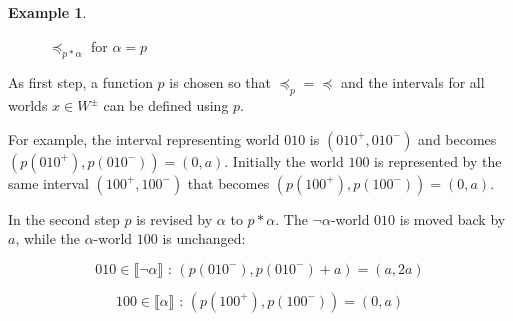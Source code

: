 \documentclass[english, 12pt]{scrartcl}
\theoremstyle{definition}
\newtheorem{example}{Example}
\theoremstyle{definition}
\theoremstyle{definition}
\newcommand{\modelsOf}[1]{\llbracket #1 \rrbracket}
\begin{document}
\begin{example}
\begin{figure}[H]
            \caption{$\preceq_{p \ast \alpha}$ for $\alpha = p$}
            \label{fig:example-preceq-revised}
    \end{figure}
    
    As first step, a function $p$ is chosen so that $\preceq_{p} = \preceq$ and the intervals for all worlds $x \in W^{\pm}$ can be defined using $p$.
    
    For example, the interval representing world $010$ is $(010^{+}, 010^{-})$ and becomes $(p(010^{+}), p(010^{-})) = (0, a)$. Initially the world $100$ is represented by the same interval $(100^{+}, 100^{-})$ that becomes $(p(100^{+}), p(100^{-})) = (0, a)$.
    
    \bigskip
    
    In the second step $p$ is revised by $\alpha$ to $p \ast \alpha$. The $\neg\alpha$-world $010$ is moved back by $a$, while the $\alpha$-world $100$ is unchanged:
    
    \begin{equation*}
        010 \in \modelsOf{\neg\alpha} \textrm{ : } (p(010^{-}), p(010^{-}) + a) = (a, 2a)
    \end{equation*}
    
    \begin{equation*}
        100 \in \modelsOf{\alpha} \textrm{ : } (p(100^{+}), p(100^{-})) = (0, a)
    \end{equation*}
\end{example}
\end{document}
